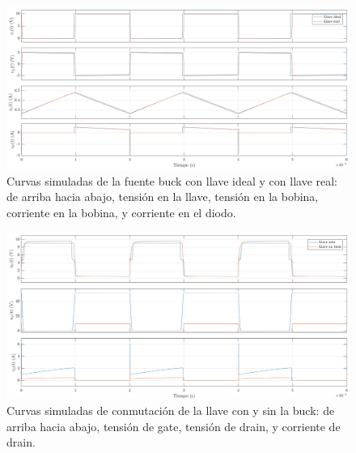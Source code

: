 \documentclass[e4_tp1_main.tex]{subfiles}
\begin{document}
\begin{landscape}
	\vspace*{\fill}
	\begin{figure}[ht]
		\centering
		\includegraphics[scale=0.7]{images/ej3/curvas3.png}
		\caption{Curvas simuladas de la fuente buck con llave ideal y con llave real: de arriba hacia abajo, tensi\'on en la llave, tensi\'on en la bobina, corriente en la bobina, y corriente en el diodo.}
		\label{fig:curvas3}
	\end{figure}
	\vspace*{\fill}
\end{landscape}

\begin{landscape}
	\vspace*{\fill}
	\begin{figure}[ht]
		\centering
		\includegraphics[scale=0.67]{images/ej3/conmutacion3.png}
		\caption{Curvas simuladas de conmutaci\'on de la llave con y sin la buck: de arriba hacia abajo, tensi\'on de gate, tensi\'on de drain, y corriente de drain.}
		\label{fig:curvas3}
	\end{figure}
	\vspace*{\fill}
\end{landscape}
\end{document}
